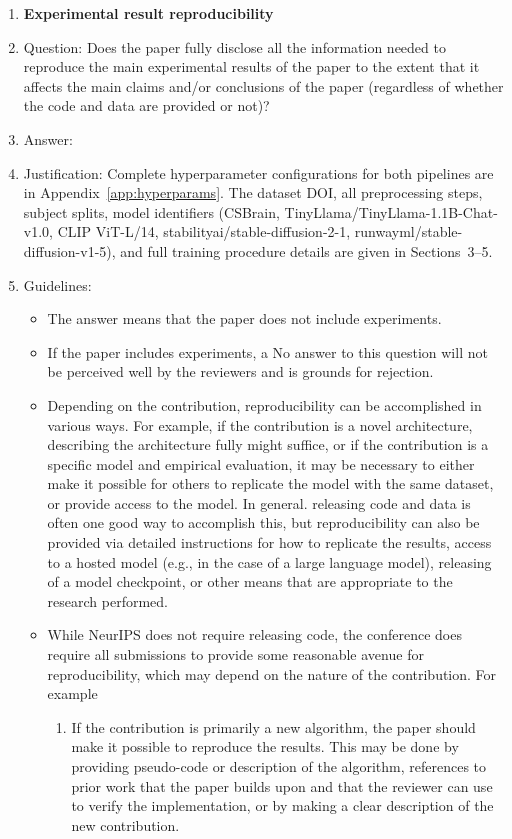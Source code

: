 \documentclass{article}
\begin{document}
\begin{enumerate}
\item {\bf Experimental result reproducibility}
    \item[] Question: Does the paper fully disclose all the information needed to reproduce the main experimental results of the paper to the extent that it affects the main claims and/or conclusions of the paper (regardless of whether the code and data are provided or not)?
    \item[] Answer: \answerYes{}
    \item[] Justification: Complete hyperparameter configurations for both pipelines are in Appendix~\ref{app:hyperparams}. The dataset DOI, all preprocessing steps, subject splits, model identifiers (CSBrain, TinyLlama/TinyLlama-1.1B-Chat-v1.0, CLIP ViT-L/14, stabilityai/stable-diffusion-2-1, runwayml/stable-diffusion-v1-5), and full training procedure details are given in Sections~3--5.
    \item[] Guidelines:
    \begin{itemize}
        \item The answer \answerNA{} means that the paper does not include experiments.
        \item If the paper includes experiments, a No answer to this question will not be perceived well by the reviewers and is grounds for rejection.
        \item Depending on the contribution, reproducibility can be accomplished in various ways. For example, if the contribution is a novel architecture, describing the architecture fully might suffice, or if the contribution is a specific model and empirical evaluation, it may be necessary to either make it possible for others to replicate the model with the same dataset, or provide access to the model. In general. releasing code and data is often one good way to accomplish this, but reproducibility can also be provided via detailed instructions for how to replicate the results, access to a hosted model (e.g., in the case of a large language model), releasing of a model checkpoint, or other means that are appropriate to the research performed.
        \item While NeurIPS does not require releasing code, the conference does require all submissions to provide some reasonable avenue for reproducibility, which may depend on the nature of the contribution. For example
        \begin{enumerate}
            \item If the contribution is primarily a new algorithm, the paper should make it possible to reproduce the results. This may be done by providing pseudo-code or description of the algorithm, references to prior work that the paper builds upon and that the reviewer can use to verify the implementation, or by making a clear description of the new contribution.

\end{enumerate}
\end{itemize}
\end{enumerate}
\end{document}
